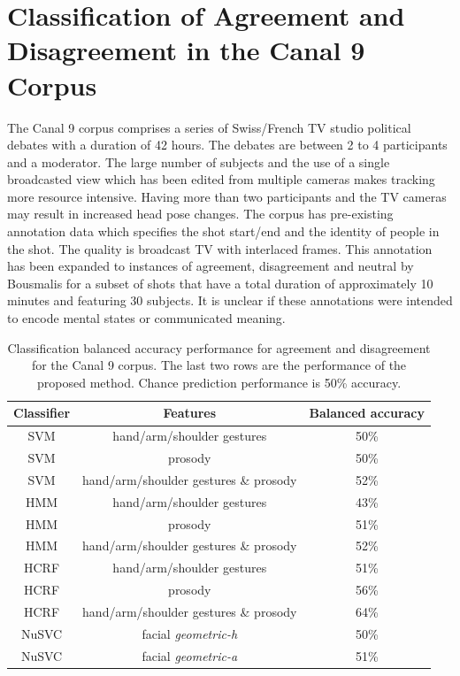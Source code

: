\section{Classification of Agreement and Disagreement in the Canal 9 Corpus}
\label{SectionCanal9}

The Canal 9 corpus comprises a series of Swiss/French TV studio political debates with a duration of 42 hours. The debates are between 2 to 4 participants and a moderator. The large number of subjects and the use of a single broadcasted view which has been edited from multiple cameras makes tracking more resource intensive. Having more than two participants and the TV cameras may result in increased head pose changes. The corpus has pre-existing annotation data which specifies the shot start/end and the identity of people in the shot. The quality is broadcast TV with interlaced frames. This annotation has been expanded to instances of agreement, disagreement and neutral by Bousmalis \etal \cite{Bousmalis2011} for a subset of shots that have a total duration of approximately 10 minutes and featuring 30 subjects. It is unclear if these annotations were intended to encode mental states or communicated meaning.

\begin{table}[tb]
\centering
\caption[Classification balanced accuracy performance for agreement and disagreement for the Canal 9 corpus.]{Classification balanced accuracy performance for agreement and disagreement for the Canal 9 corpus. The last two rows are the performance of the proposed method. Chance prediction performance is 50\% accuracy.}
\scriptsize 
\begin{tabular}{ c | c || c }
Classifier & Features & Balanced accuracy \\
\hline
SVM & hand/arm/shoulder gestures & 50\% \cite{Bousmalis2011}\\
SVM & prosody & 50\% \cite{Bousmalis2011}\\
SVM & hand/arm/shoulder gestures \& prosody & 52\% \cite{Bousmalis2011}\\
HMM & hand/arm/shoulder gestures & 43\% \cite{Bousmalis2011}\\
HMM & prosody & 51\% \cite{Bousmalis2011}\\
HMM & hand/arm/shoulder gestures \& prosody & 52\% \cite{Bousmalis2011}\\
HCRF & hand/arm/shoulder gestures & 51\% \cite{Bousmalis2011}\\
HCRF & prosody & 56\% \cite{Bousmalis2011}\\
HCRF & hand/arm/shoulder gestures \& prosody & 64\% \cite{Bousmalis2011}\\
\hline
NuSVC & facial \textit{geometric-h} & 50\% \\
NuSVC & facial \textit{geometric-a} & 51\% \\
\end{tabular}
\normalsize
\label{TableCanal9}
\end{table}

